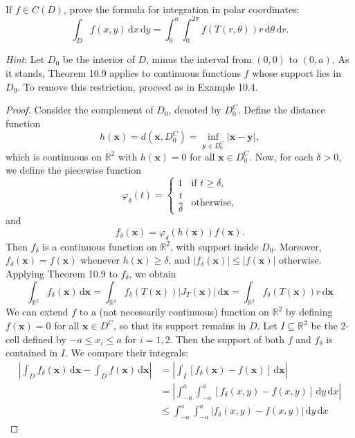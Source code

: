 \documentclass[12pt]{article}
\newenvironment{fullbox}{\begin{lrbox}{\savefullbox}\begin{minipage}{\dimexpr\textwidth-2\fboxsep\relax}}{\end{minipage}\end{lrbox}\begin{center}\framebox[\textwidth]{\usebox{\savefullbox}}\end{center}}
\newenvironment{pbox}[1][]{\begin{fullbox}\ifx#1\empty\else\paragraph{#1}\fi}{\end{fullbox}}
\newcommand{\R}{\mathbb{R}}
\renewcommand{\phi}{\varphi}
\newcommand{\<}{\langle}
\renewcommand{\>}{\rangle}
\newcommand{\x}{\mathbf{x}}
\newcommand{\y}{\mathbf{y}}
\newcommand{\dd}[1]{\,\mathrm{d}#1}
\begin{document}
\newpage
\begin{pbox}
    If $f \in C(D)$, prove the formula for integration in polar coordinates:
    \[
        \int_D f(x,y) \dd{x}\dd{y} = \int_{0}^{a} \int_{0}^{2\pi} f(T(r,\theta))r \dd{\theta} \dd{r}.
    \]
    
    \textit{Hint}: Let $D_0$ be the interior of $D$, minus the interval from $(0,0)$ to $(0,a)$. As it stands, Theorem 10.9 applies to continuous functions $f$ whose support lies in $D_0$. To remove this restriction, proceed as in Example 10.4.
\end{pbox}

\begin{proof}
    Consider the complement of $D_0$, denoted by $D_0^C$. Define the distance function
    \[
        h(\x) = d(\x, D_0^C) = \inf_{\y \in D_0^C} |\x - \y|,
    \]
    which is continuous on $\R^2$ with $h(\x) = 0$ for all $\x \in D_0^C$. Now, for each $\delta > 0$, we define the piecewise function
    \[
        \phi_\delta(t) =
        \begin{cases}
            1 &\text{if } t \geq \delta, \\
            \dfrac{t}{\delta} &\text{otherwise},
        \end{cases}
    \]
    and
    \[
        f_\delta(\x) = \phi_\delta(h(\x))f(\x).
    \]
    Then $f_\delta$ is a continuous function on $\R^2$, with support inside $D_0$. Moreover, $f_\delta(\x) = f(\x)$ whenever $h(\x) \geq \delta$, and $|f_\delta(\x)| \leq |f(\x)|$ otherwise. Applying Theorem 10.9 to $f_\delta$, we obtain
    \[
        \int_{\R^2} f_\delta(\x) \dd{\x} 
            = \int_{\R^2} f_\delta(T(\x)) |J_T(\x)| \dd{\x}
            = \int_{\R^2} f_\delta(T(\x)) r \dd{\x}
        \tag{1}
    \]
    We can extend $f$ to a (not necessarily continuous) function on $\R^2$ by defining $f(\x) = 0$ for all $\x \in D^C$, so that its support remains in $D$. Let $I \subseteq \R^2$ be the $2$-cell defined by $-a \leq x_i \leq a$ for $i = 1, 2$. Then the support of both $f$ and $f_\delta$ is contained in $I$. We compare their integrals:
    \begin{align*}
        \left| \int_{D} f_\delta(\x) \dd{\x} - \int_{D} f(\x) \dd{\x} \right|
            &= \left| \int_{I} [f_\delta(\x) - f(\x)] \dd{\x} \right| \\
            &= \left| \int_{-a}^{a} \int_{-a}^{a} [f_\delta(x, y) - f(x, y)] \dd{y} \dd{x} \right| \\
            &\leq \int_{-a}^{a} \int_{-a}^{a} |f_\delta(x, y) - f(x, y)| \dd{y} \dd{x}
    \end{align*}

\end{proof}
\end{document}
